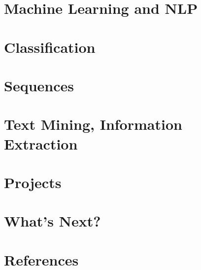 \section[MLNLP]{Machine Learning and NLP}

 


\section[Class]{Classification}




\section[Seq]{Sequences}



\section[IR]{Text Mining, Information Extraction}
 


\section[Prj]{Projects}
%  

\section[Next]{What's Next?}



\section[Refs]{References}


